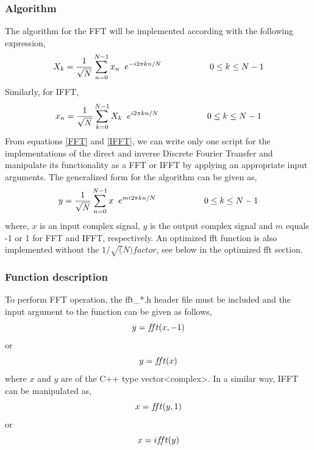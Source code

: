 \begin{refsection}
\subsubsection{Algorithm}
The algorithm for the FFT will be implemented according with the following expression,
\begin{equation}
X_k =\dfrac{1}{\sqrt{N}}\sum\limits_{n=0}^{N-1} x_n \hspace{2mm} e^{-i2\pi kn/N}		\hspace{2cm}	0\leq k \leq N-1
\label{FFT}
\end{equation}
Similarly, for IFFT,
\begin{equation}
x_n =\frac{1}{\sqrt{N}} \sum\limits_{k=0}^{N-1} X_k \hspace{2mm}  e^{i2\pi kn/N}		\hspace{2cm}	0\leq k \leq N-1
\label{IFFT}
\end{equation}
From equations \ref{FFT} and \ref{IFFT}, we can write only one script for the implementations of the direct and inverse Discrete Fourier Transfer and manipulate its functionality as a FFT or IFFT by applying an appropriate input arguments. The generalized form for the algorithm can be given as,
\begin{equation}
y =\frac{1}{\sqrt{N}} \sum\limits_{n=0}^{N-1} x \hspace{2mm}  e^{m  i2\pi kn/N}		\hspace{2cm}	0\leq k \leq N-1
\label{FT}
\end{equation}
where, $x$ is an input complex signal, $y$ is the output complex signal and $m$ equals -1 or 1 for FFT and IFFT, respectively. An optimized fft function is also implemented without the $1/\sqrt(N) factor$, see below in the optimized fft section.

\subsubsection{Function description}
To perform FFT operation, the fft\_*.h header file must be included and the input argument to the function can be given as follows,
\begin{equation*}
y=f\hspace{-0.85mm}ft(x,-1)
\end{equation*}
or
\begin{equation*}
	y = f\hspace{-0.85mm}ft(x)
\end{equation*}
where $x$ and $y$ are of the C++ type vector<complex>. In a similar way, IFFT can be manipulated as,
\begin{equation*}
x = f\hspace{-0.85mm}ft(y,1)
\end{equation*}
or
\begin{equation*}
	x = if\hspace{-0.85mm}ft(y)
\end{equation*}


\end{refsection}
